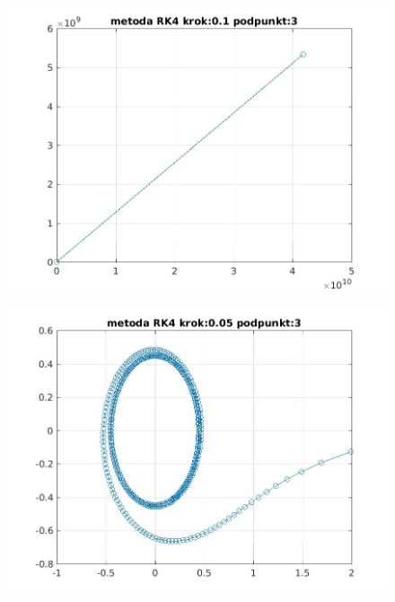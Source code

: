 \documentclass[a4paper, 11pt]{article}
\begin{document}
\begin{figure}[htp]
\centering
\includegraphics[width = 15cm]{2d/metoda RK4 krok:0,1 podpunkt:3.jpg}
\end{figure}

\begin{figure}[htp]
\centering
\includegraphics[width = 15cm]{2d/metoda RK4 krok:0,05 podpunkt:3.jpg}
\end{figure}
\end{document}
